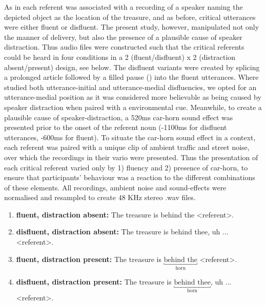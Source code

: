 \documentclass[a4paper,man,natbib]{apa6}
\begin{document}
As in \citet{Loy2016} each referent was associated with a recording of a speaker naming the depicted object as the location of the treasure, and as before, critical utterances were either fluent or disfluent. 
The present study, however, manipulated not only the manner of delivery, but also the presence of a plausible cause of speaker distraction. 
Thus audio files were constructed such that the critical referents could be heard in four conditions in a 2 (fluent/disfluent) x 2 (distraction absent/present) design, see below. 
The disfluent variants were created by splicing a prolonged article followed by a filled pause () into the fluent utterances.
Where \citet{Loy2016} studied both utterance-initial and utterance-medial disfluencies, we opted for an utterance-medial position as it was considered more believable as being caused by speaker distraction when paired with a environmental cue.
Meanwhile, to create a plausible cause of speaker-distraction, a 520ms car-horn sound effect was presented prior to the onset of the referent noun (-1100ms for disfluent utterances, -600ms for fluent). 
To situate the car-horn sound effect in a context, each referent was paired with a unique clip of ambient traffic and street noise, over which the recordings in their vario were presented.
Thus the presentation of each critical referent varied only by 1) fluency and 2) presence of car-horn, to ensure that participants' behaviour was a reaction to the different combinations of these elements. 
All recordings, ambient noise and sound-effects were normalised and resampled to create 48 KHz stereo .wav files.\\
\begin{enumerate}
\item \textbf{fluent, distraction absent:} The treasure is behind the \textless referent\textgreater .
\item \textbf{disfluent, distraction absent:} The treasure is behind thee, uh ... \textless referent\textgreater .
\item \textbf{fluent, distraction present:} The treasure is $\underbracket{\text{behind the}}_\text{horn}$ \textless referent\textgreater .
\item \textbf{disfluent, distraction present:} The treasure is $\underbracket{\text{behind thee}}_\text{horn}$, uh ...\textless referent\textgreater .
\end{enumerate}
\end{document}
